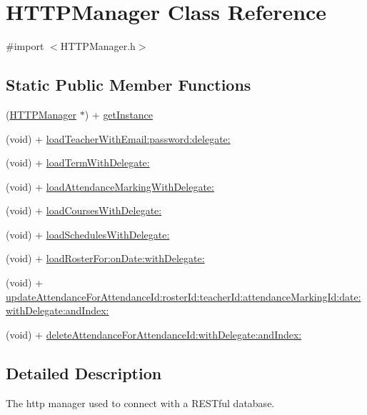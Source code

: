 \hypertarget{interface_h_t_t_p_manager}{\section{\-H\-T\-T\-P\-Manager \-Class \-Reference}
\label{interface_h_t_t_p_manager}
}


{\ttfamily \#import $<$\-H\-T\-T\-P\-Manager.\-h$>$}

\subsection*{\-Static \-Public \-Member \-Functions}
\begin{DoxyCompactItemize}
\item 
(\hyperlink{interface_h_t_t_p_manager}{\-H\-T\-T\-P\-Manager} $\ast$) + \hyperlink{interface_h_t_t_p_manager_a2476228b452731c9f984c91ce08d90b4}{get\-Instance}
\item 
(void) + \hyperlink{interface_h_t_t_p_manager_a394e5d96ca7b2c7d15f4e66d697333bf}{load\-Teacher\-With\-Email\-:password\-:delegate\-:}
\item 
(void) + \hyperlink{interface_h_t_t_p_manager_a32189e50eb0e77717fbfe7b9ac435822}{load\-Term\-With\-Delegate\-:}
\item 
(void) + \hyperlink{interface_h_t_t_p_manager_a646f3a02b67b3e3dfe333d5e99061735}{load\-Attendance\-Marking\-With\-Delegate\-:}
\item 
(void) + \hyperlink{interface_h_t_t_p_manager_a67085a1f0d8ac7608d728a30fc7bb6b4}{load\-Courses\-With\-Delegate\-:}
\item 
(void) + \hyperlink{interface_h_t_t_p_manager_a4c84623e4df46ebd225c9aec5fd7627a}{load\-Schedules\-With\-Delegate\-:}
\item 
(void) + \hyperlink{interface_h_t_t_p_manager_a4a0a7677d96e5e07b4c8a1e4e85fb7fb}{load\-Roster\-For\-:on\-Date\-:with\-Delegate\-:}
\item 
(void) + \hyperlink{interface_h_t_t_p_manager_a173519d82e3f0db823a6ea90095a2eaf}{update\-Attendance\-For\-Attendance\-Id\-:roster\-Id\-:teacher\-Id\-:attendance\-Marking\-Id\-:date\-:with\-Delegate\-:and\-Index\-:}
\item 
(void) + \hyperlink{interface_h_t_t_p_manager_a1602c57ee43246282495892a2959b417}{delete\-Attendance\-For\-Attendance\-Id\-:with\-Delegate\-:and\-Index\-:}
\end{DoxyCompactItemize}


\subsection{\-Detailed \-Description}
\-The http manager used to connect with a \-R\-E\-S\-Tful database. 

